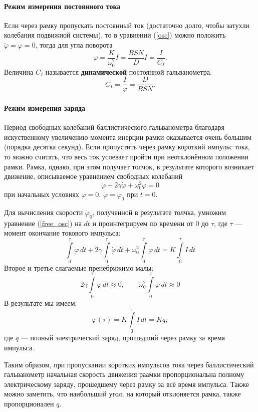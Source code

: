 \documentclass[12pt]{article}
\begin{document}
\paragraph{Режим измерения постоянного тока}
\par 
	Если через рамку пропускать постоянный ток (достаточно долго, чтобы затухли колебания подвижной системы), то  в уравнении (\ref{osc}) можно положить $\ddot \varphi = \dot \varphi = 0$, тогда для угла поворота
\[
	\varphi = \frac{K}{\omega_0^2}I = \frac{BSN}{D}I = \frac{I}{C_I}.
\]
Величина $C_I$ называется {\bf динамической} постоянной гальванометра.
\[
	C_I = \frac{I}{\varphi} = \frac{D}{BSN}.
\]
\paragraph{Режим измерения заряда}
\par 
	Период свободных колебаний баллистического гальванометра благодаря искуственному увеличению момента инерции рамки оказывается очень большим (порядка десятка секунд). Если пропустить через рамку короткий импульс тока, то можно считать, что весь ток успевает пройти при неотклонённом положении рамки. Рамка, однако, при этом получает толчок, в результате которого возникает движение, описываемое уравнением свободных колебаний
\[
	\ddot \varphi + 2 \gamma \dot \varphi + \omega_0^2 \varphi = 0 \label{free_osc}
\]
при начальных условиях $\varphi = 0$, $\dot \varphi = \dot \varphi_0$ при $t = 0$.
\par
	Для вычисления скорости $\dot \varphi_0$, полученной в результате толчка, умножим уравнение (\ref{free_osc}) на $dt$ и проинтегрируем по времени от 0 до $\tau$, где $\tau$ --- момент окончание токового импульса:
\[
	\int\limits_0^\tau \ddot \varphi \,dt + 2\gamma \int\limits_0^\tau \dot \varphi \,dt + \omega_0^2 \int\limits_0^\tau \varphi \,dt = K \int\limits_0^\tau I \,dt
\]
Второе и третье слагаемые пренебрижимо малы:
\[
	2 \gamma \int\limits_0^\tau \dot \varphi \,dt \approx 0, \qquad \omega_0^2 \int\limits_0^\tau \varphi \, dt \approx 0 
\]
В результате мы имеем:
\[
	\dot \varphi(\tau) = K \int\limits_0^\tau I \,dt = Kq,
\]
где $q$ --- полный электрический заряд, прошедший через рамку за время импульса.
\par
	Таким образом, при пропускании коротких импульсов тока через баллистический гальванометр начальная скорость движения раамки пропорциональна полному электрическому заряду, прошедшему через рамку за всё время импульса. Также можно заметить, что наибольший угол, на который отклоняется рамка, также пропорционален $q$.
\end{document}
